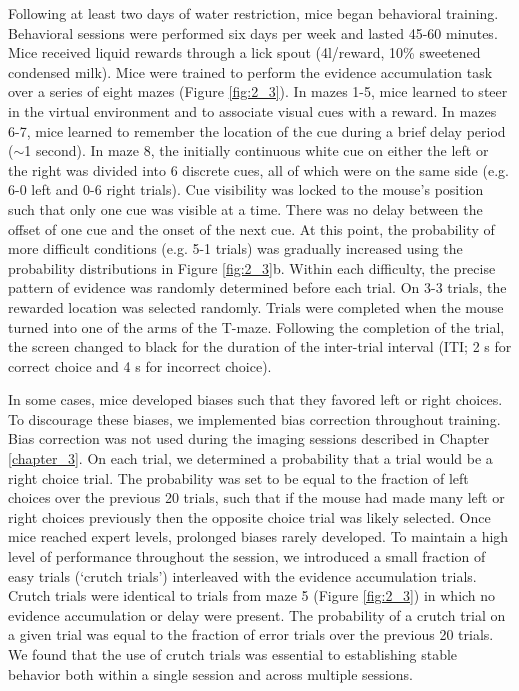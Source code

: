 Following at least two days of water restriction, mice began behavioral training. Behavioral sessions were performed six days per week and lasted 45-60 minutes. Mice received liquid rewards through a lick spout (4\textmu l/reward, 10\% sweetened condensed milk). Mice were trained to perform the evidence accumulation task over a series of eight mazes (Figure \ref{fig:2_3}). In mazes 1-5, mice learned to steer in the virtual environment and to associate visual cues with a reward. In mazes 6-7, mice learned to remember the location of the cue during a brief delay period ($\sim$1 second). In maze 8, the initially continuous white cue on either the left or the right was divided into 6 discrete cues, all of which were on the same side (e.g. 6-0 left and 0-6 right trials). Cue visibility was locked to the mouse’s position such that only one cue was visible at a time. There was no delay between the offset of one cue and the onset of the next cue. At this point, the probability of more difficult conditions (e.g. 5-1 trials) was gradually increased using the probability distributions in Figure \ref{fig:2_3}b. Within each difficulty, the precise pattern of evidence was randomly determined before each trial. On 3-3 trials, the rewarded location was selected randomly. Trials were completed when the mouse turned into one of the arms of the T-maze. Following the completion of the trial, the screen changed to black for the duration of the inter-trial interval (ITI; 2 s for correct choice and 4 s for incorrect choice).
 
\bigskip
In some cases, mice developed biases such that they favored left or right choices. To discourage these biases, we implemented bias correction throughout training. Bias correction was not used during the imaging sessions described in Chapter \ref{chapter_3}. On each trial, we determined a probability that a trial would be a right choice trial. The probability was set to be equal to the fraction of left choices over the previous 20 trials, such that if the mouse had made many left or right choices previously then the opposite choice trial was likely selected. Once mice reached expert levels, prolonged biases rarely developed. To maintain a high level of performance throughout the session, we introduced a small fraction of easy trials (‘crutch trials’) interleaved with the evidence accumulation trials. Crutch trials were identical to trials from maze 5 (Figure \ref{fig:2_3}) in which no evidence accumulation or delay were present. The probability of a crutch trial on a given trial was equal to the fraction of error trials over the previous 20 trials. We found that the use of crutch trials was essential to establishing stable behavior both within a single session and across multiple sessions.

